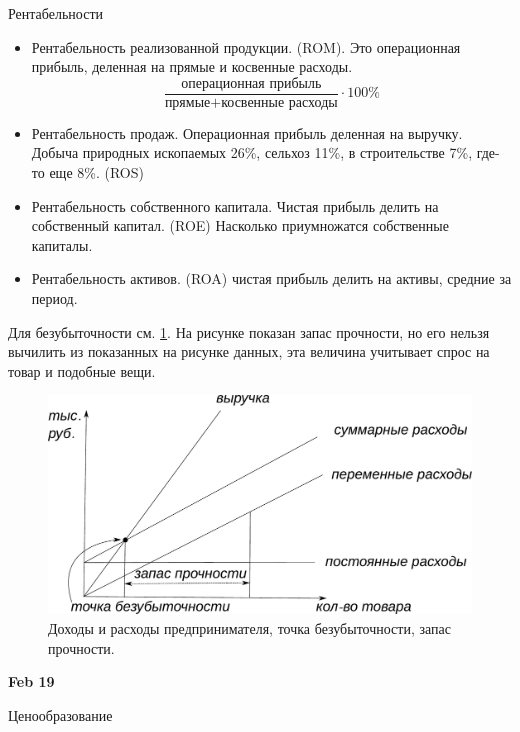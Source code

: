 \documentclass[a4paper, 12pt]{article}
\def\datee#1{\hfill\textbf{#1} \par}
\begin{document}
Рентабельности
\begin{itemize}
\item Рентабельность реализованной продукции. (ROM). Это операционная прибыль, деленная на прямые и косвенные расходы. 
$$
\frac{\text{операционная прибыль}}{\text{прямые}+\text{косвенные расходы}} \cdot 100\%
$$
\item Рентабельность продаж. Операционная прибыль деленная на выручку. Добыча природных ископаемых 26\%, сельхоз 11\%, в строительстве 7\%, где-то еще 8\%. (ROS)
\item Рентабельность собственного капитала. Чистая прибыль делить на собственный капитал. (ROE) Насколько приумножатся собственные капиталы. 
\item Рентабельность активов. (ROA) чистая прибыль делить на активы, средние за период. 
\end{itemize}


Для безубыточности см. \ref{fig:income-goods}. На рисунке показан запас прочности, но его нельзя вычилить из показанных на рисунке данных, эта величина учитывает спрос на товар и подобные вещи. 

\begin{figure}
\includegraphics[width=.7\linewidth]{figures/income-goods}
\caption{Доходы и расходы предпринимателя, точка безубыточности, запас прочности.}
\label{fig:income-goods}
\end{figure}


\datee{Feb 19}
Ценообразование 
\end{document}
